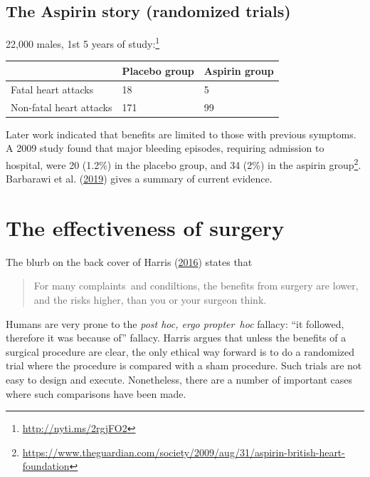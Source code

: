\documentclass[
  10pt,
  b5paper]{book}
\begin{document}
\hypertarget{the-aspirin-story-randomized-trials}{%
\subsection*{The Aspirin story (randomized trials)}\label{the-aspirin-story-randomized-trials}}

22,000 males, 1st 5 years of study:\footnote{\url{http://nyti.ms/2rgjFO2}}

\begin{longtable}[]{@{}lll@{}}
\toprule\noalign{}
& Placebo group & Aspirin group \\
\midrule\noalign{}
\endhead
\bottomrule\noalign{}
\endlastfoot
Fatal heart attacks & 18 & 5 \\
Non-fatal heart attacks & 171 & 99 \\
\end{longtable}

Later work indicated that benefits are limited to those with previous
symptoms. A 2009 study found that major bleeding episodes, requiring
admission to hospital, were 20 (1.2\%) in the placebo group, and 34 (2\%)
in the aspirin group\footnote{\url{https://www.theguardian.com/society/2009/aug/31/aspirin-british-heart-foundation}}. Barbarawi et al. (\protect\hyperlink{ref-barbarawi2019aspirin}{2019}) gives a
summary of current evidence.

\hypertarget{the-effectiveness-of-surgery}{%
\section{The effectiveness of surgery}\label{the-effectiveness-of-surgery}}

The blurb on the back cover of Harris (\protect\hyperlink{ref-harris2016book}{2016}) states that

\begin{quote}
For many complaints~and condiltions, the benefits from surgery are
lower, and the risks higher, than you or your surgeon think.
\end{quote}

Humans are very prone to the \emph{post hoc, ergo propter~hoc} fallacy: ``it
followed, therefore it was because of'' fallacy. Harris argues that
unless the benefits of a surgical procedure are clear, the only ethical
way forward is to do a randomized trial where the procedure is compared
with a sham procedure. Such trials are not easy to design and execute.
Nonetheless, there are a number of important cases where such
comparisons have been made.
\end{document}
